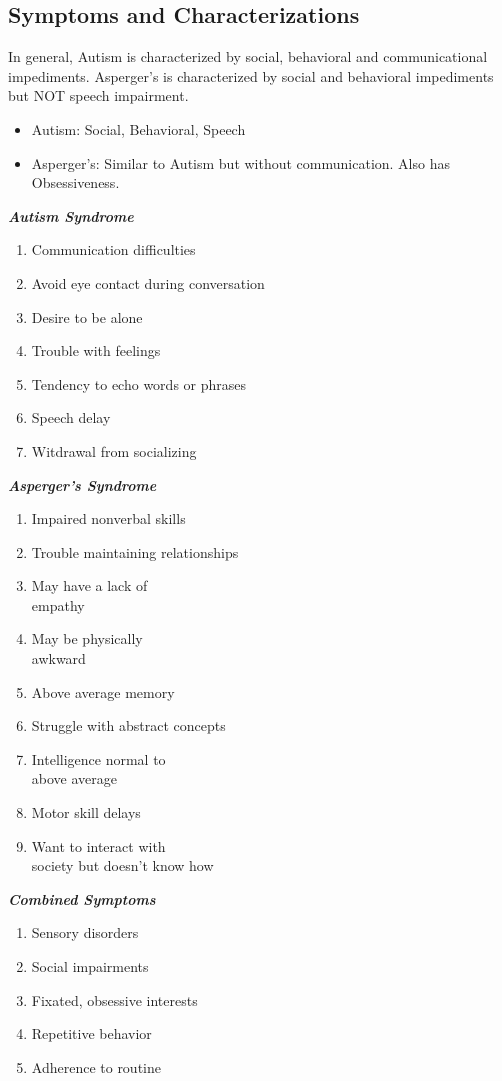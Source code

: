 \documentclass[journal, 12pt]{IEEEtran}
\begin{document}
\subsection{Symptoms and Characterizations}
In general, Autism is characterized by social, behavioral and communicational impediments. Asperger's is characterized by social and behavioral impediments but NOT speech impairment. 
\begin{itemize}
\item Autism: Social, Behavioral, Speech
\item Asperger's: Similar to Autism but without communication. Also has Obsessiveness. 
\end{itemize}
\noindent\parbox[t]{2.1in}{\raggedright%
\textbf{\textit{Autism Syndrome}}
\begin{enumerate}[topsep=0pt,itemsep=-2pt,leftmargin=7pt]
\item Communication difficulties
\item Avoid eye contact during conversation
\item Desire to be alone 
\item Trouble with feelings 
\item Tendency to echo words or phrases
\item Speech delay 
\item Witdrawal from socializing
\end{enumerate}
}%
\parbox[t]{2.1in}{\raggedright%
\textbf{\textit{Asperger's Syndrome}}
\begin{enumerate}[topsep=0pt,itemsep=-2pt,leftmargin=7pt]
\item Impaired nonverbal skills
\item Trouble maintaining relationships
\item May have a lack of 
\\
empathy
\item May be physically 
\\
awkward
\item Above average memory
\item Struggle with abstract concepts 
\item Intelligence normal to 
\\
above average 
\item Motor skill delays
\item Want to interact with 
\\
society but doesn't know how 
\end{enumerate}
}
\parbox[t]{2.4in}{\raggedright%
\textbf{\textit{Combined Symptoms}}
\begin{enumerate}[topset=0pt,itemsep=-2pt,leftmargin=13pt]
\item Sensory disorders
\item Social impairments
\item Fixated, obsessive interests
\item Repetitive behavior
\item Adherence to routine
\end{enumerate}
}%
\\
\vspace{2 mm}
\end{document}
